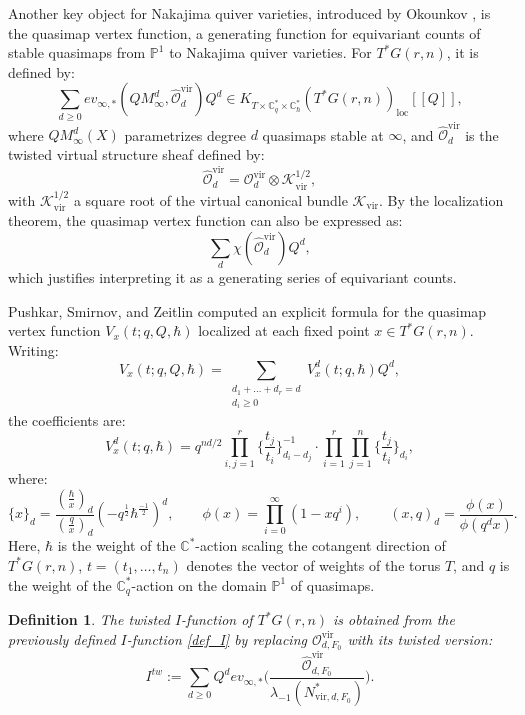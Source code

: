 \documentclass{amsart}
\newtheorem{definition}{Definition}
\begin{document}
Another key object for Nakajima quiver varieties, introduced by Okounkov \cite{MR3752463}, is the quasimap vertex function, a generating function for equivariant counts of stable quasimaps from $\mathbb{P}^1$ to Nakajima quiver varieties. For $T^*G(r,n)$, it is defined by: 
 \[
 \sum_{d \geq 0}ev_{{\infty},*}(QM^d_{\infty}, \hat{\mathcal{O}}^{{\mathrm{vir}}}_d) Q^d \in K_{T \times \mathbb{C}^*_q \times \mathbb{C}^*_{\hbar}}(T^*G(r,n))_{\mathrm{loc}}[[Q]],
\]
where $QM^d_{\infty}(X)$ parametrizes degree $d$ quasimaps stable at $\infty$, and $\hat{\mathcal{O}}_d^{{\mathrm{vir}}}$ is the twisted virtual structure sheaf defined by:
\[
\hat{\mathcal{O}}_d^{{\mathrm{vir}}} = {\mathcal{O}^{{\mathrm{vir}}}_d} \otimes \mathcal{K}_{\mathrm{vir}}^{1/2},
\]
with $\mathcal{K}_{\mathrm{vir}}^{1/2}$ a square root of the 
virtual canonical bundle $\mathcal{K}_{\mathrm{vir}}$.
By the localization theorem, the quasimap vertex function can 
also be expressed as:
\[
\sum_{d} \chi(\hat{\mathcal{O}}^{{\mathrm{vir}}}_d)Q^d,
\]
which justifies interpreting it as a generating series of equivariant counts.


Pushkar, Smirnov, and Zeitlin \cite{PSZ} computed an explicit formula for the quasimap vertex function $V_x(t;q,Q,\hbar)$ localized at each fixed point $x \in T^*G(r,n)$. Writing:
\[
V_x(t;q,Q,\hbar) = \sum_{\substack{d_1+\dots+d_r=d \\ d_i \ge 0}}V_x^d(t;q,\hbar) Q^d , 
\]
the coefficients are:
\[
V_x^d(t;q,\hbar) = q^{nd/2}\prod_{i,j=1}^r \{\frac{t_j}{t_i}\}_{d_i-d_j}^{-1} \cdot \prod_{i=1}^{r}\prod_{j=1}^{n}\{\frac{t_j}{t_i}\}_{d_i} ,
\]
where:
\[
\{x\}_d = \frac{(\frac{\hbar}{x})_d}{(\frac{q}{x})_d}(-q^{\frac{1}{2}}\hbar^{\frac{-1}{2}})^d, \quad \quad \phi(x) = \prod_{i=0}^{\infty}(1-xq^i), \quad   \quad (x,q)_d = \frac{\phi(x)}{\phi(q^dx)}\text{.}
\]
Here, $\hbar$ is the weight of the $\mathbb{C}^*$-action scaling the cotangent direction of $T^*G(r,n)$, $t=(t_1,\dots,t_n)$ denotes the vector of weights of the torus $T$, and $q$ is the weight of the $\mathbb{C}^*_q$-action on the domain $\mathbb{P}^1$ of quasimaps.
\begin{definition}
    The twisted $I$-function of $T^* G(r,n)$ is obtained from the previously defined $I$-function \eqref{def_I} by replacing $\mathcal{O}_{d,F_0}^{\mathrm{vir}}$ with its twisted version:
\begin{equation}
I^{tw} := \sum_{d \geq 0} Q^d ev_{{\infty},*}\Big(\frac{\hat{\mathcal{O}}_{d,F_0}^{\mathrm{vir}}}{\lambda_{-1}(N_{\mathrm{vir},d,F_0}^{*})}\Big).
\end{equation}
\end{definition}
\end{document}
